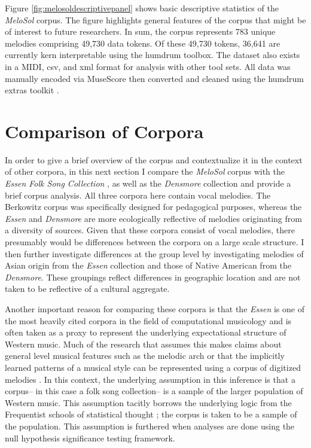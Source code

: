 \documentclass[12pt,]{book}
\begin{document}
Figure \ref{fig:melosoldescriptivepanel} shows basic descriptive statistics of the \emph{MeloSol} corpus.
The figure highlights general features of the corpus that might be of interest to future researchers.
In sum, the corpus represents 783 unique melodies comprising 49,730 data tokens.
Of these 49,730 tokens, 36,641 are currently kern interpretable using the humdrum toolbox.
The dataset also exists in a MIDI, csv, and xml format for analysis with other tool sets.
All data was manually encoded via MuseScore then converted and cleaned using the humdrum extras toolkit \citep{sappHumdrumExtras2008, wernerMuseScore2019}.

\hypertarget{comparison-of-corpora}{%
\section{Comparison of Corpora}\label{comparison-of-corpora}}

In order to give a brief overview of the corpus and contextualize it in the context of other corpora, in this next section I compare the \emph{MeloSol} corpus with the \emph{Essen Folk Song Collection} \citep{schaffrathEssenFolkSong1995}, as well as the \emph{Densmore} collection \citep{shanahanDensmoreCollectionNative2014} and provide a brief corpus analysis.
All three corpora here contain vocal melodies.
The Berkowitz corpus was specifically designed for pedagogical purposes, whereas the \emph{Essen} and \emph{Densmore} are more ecologically reflective of melodies originating from a diversity of sources.
Given that these corpora consist of vocal melodies, there presumably would be differences between the corpora on a large scale structure.
I then further investigate differences at the group level by investigating melodies of Asian origin from the \emph{Essen} collection and those of Native American from the \emph{Densmore}.
These groupings reflect differences in geographic location and are not taken to be reflective of a cultural aggregate.

Another important reason for comparing these corpora is that the \emph{Essen} is one of the most heavily cited corpora in the field of computational musicology and is often taken as a proxy to represent the underlying expectational structure of Western music.
Much of the research that assumes this makes claims about general level musical features such as the melodic arch \citep{huronMelodicArchWestern1996, shanahanExaminingEffectOral2019} or that the implicitly learned patterns of a musical style can be represented using a corpus of digitized melodies \citep{demorestQuantifyingCulture2015, pearceStatisticalLearningProbabilistic2018a}.
In this context, the underlying assumption in this inference is that a corpus-- in this case a folk song collection-- is a sample of the larger population of Western music.
This assumption tacitly borrows the underlying logic from the Frequentist schools of statistical thought \citep{dienesUnderstandingPsychologyScience2008}; the corpus is taken to be a sample of the population.
This assumption is furthered when analyses are done using the null hypothesis significance testing framework.
\end{document}
